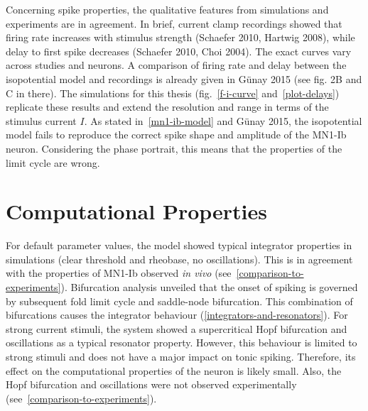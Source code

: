 \documentclass[12pt,a4paper,]{report}
\begin{document}
Concerning spike properties, the qualitative features from simulations
and experiments are in agreement. In brief, current clamp recordings
showed that firing rate increases with stimulus strength (Schaefer 2010,
Hartwig 2008), while delay to first spike decreases (Schaefer 2010, Choi
2004). The exact curves vary across studies and neurons. A comparison of
firing rate and delay between the isopotential model and recordings is
already given in Günay 2015 (see fig. 2B and C in there). The
simulations for this thesis (fig.~\ref{f-i-curve} and~\ref{plot-delays})
replicate these results and extend the resolution and range in terms of
the stimulus current $I$. As stated in~\ref{mn1-ib-model} and Günay
2015, the isopotential model fails to reproduce the correct spike shape
and amplitude of the MN1-Ib neuron. Considering the phase portrait, this
means that the properties of the limit cycle are wrong.

\section{Computational Properties}\label{computational-properties}

For default parameter values, the model showed typical integrator
properties in simulations (clear threshold and rheobase, no
oscillations). This is in agreement with the properties of MN1-Ib
observed \emph{in vivo} (see~\ref{comparison-to-experiments}).
Bifurcation analysis unveiled that the onset of spiking is governed by
subsequent fold limit cycle and saddle-node bifurcation. This
combination of bifurcations causes the integrator behaviour
(\ref{integrators-and-resonators}). For strong current stimuli, the
system showed a supercritical Hopf bifurcation and oscillations as a
typical resonator property. However, this behaviour is limited to strong
stimuli and does not have a major impact on tonic spiking. Therefore,
its effect on the computational properties of the neuron is likely
small. Also, the Hopf bifurcation and oscillations were not observed
experimentally (see~\ref{comparison-to-experiments}).
\end{document}
